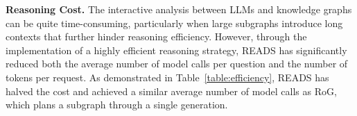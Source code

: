 \documentclass[11pt]{article}
\begin{document}
\begin{table}[h]
\centering
{}
\caption{Model universality of READS.}
\label{table:universality}
\end{table}

\noindent\textbf{Reasoning Cost.}
The interactive analysis between LLMs and knowledge graphs can be quite time-consuming, particularly when large subgraphs introduce long contexts that further hinder reasoning efficiency. However, through the implementation of a highly efficient reasoning strategy, READS has significantly reduced both the average number of model calls per question and the number of tokens per request. As demonstrated in Table~\ref{table:efficiency}, READS has halved the cost and achieved a similar average number of model calls as RoG, which plans a subgraph through a single generation.
\end{document}

